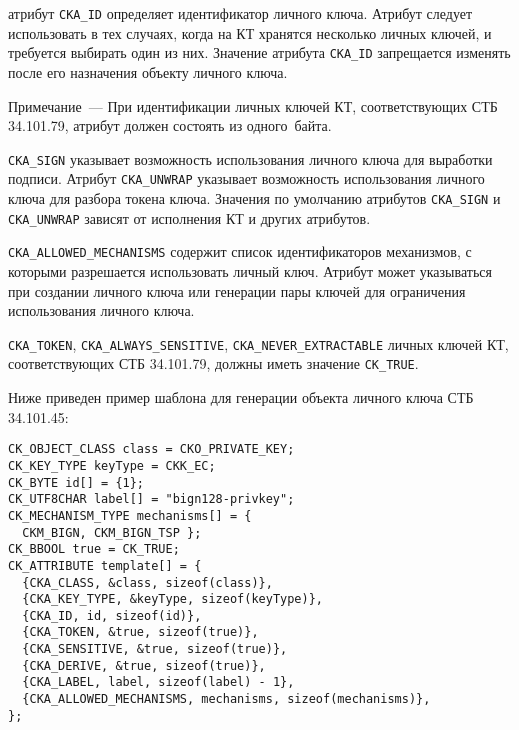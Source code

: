  атрибут \verb|CKA_ID| определяет идентификатор
личного ключа. Атрибут следует использовать в тех случаях, когда на КТ 
хранятся несколько личных ключей, и требуется выбирать один из них. 
%
Значение атрибута \verb|CKA_ID| запрещается изменять
после его назначения объекту личного ключа.

\begin{note}
Примечание~---
При идентификации личных ключей КТ, соответствующих СТБ 34.101.79,
атрибут должен состоять из одного~байта.
\end{note}


 \verb|CKA_SIGN| указывает возможность
использования личного ключа для выработки подписи.
Атрибут \verb|CKA_UNWRAP| указывает возможность
использования личного ключа для разбора токена ключа.
Значения по умолчанию атрибутов \verb|CKA_SIGN| и \verb|CKA_UNWRAP|
зависят от исполнения КТ и других атрибутов.

 \verb|CKA_ALLOWED_MECHANISMS| содержит список
идентификаторов механизмов, с которыми разрешается использовать
личный ключ. Атрибут может указываться при создании личного
ключа или генерации пары ключей для ограничения использования
личного ключа.

 \verb|CKA_TOKEN|, \verb|CKA_ALWAYS_SENSITIVE|, 
\verb|CKA_NEVER_EXTRACTABLE| 
личных ключей КТ, соответствующих СТБ 34.101.79,
должны иметь значение \verb|CK_TRUE|.


Ниже приведен пример шаблона для генерации объекта личного ключа СТБ 34.101.45:
\begin{verbatim}
CK_OBJECT_CLASS class = CKO_PRIVATE_KEY;
CK_KEY_TYPE keyType = CKK_EC;
CK_BYTE id[] = {1};
CK_UTF8CHAR label[] = "bign128-privkey";
CK_MECHANISM_TYPE mechanisms[] = {
  CKM_BIGN, CKM_BIGN_TSP };
CK_BBOOL true = CK_TRUE;
CK_ATTRIBUTE template[] = {
  {CKA_CLASS, &class, sizeof(class)},
  {CKA_KEY_TYPE, &keyType, sizeof(keyType)},
  {CKA_ID, id, sizeof(id)},
  {CKA_TOKEN, &true, sizeof(true)},
  {CKA_SENSITIVE, &true, sizeof(true)},
  {CKA_DERIVE, &true, sizeof(true)},
  {CKA_LABEL, label, sizeof(label) - 1},
  {CKA_ALLOWED_MECHANISMS, mechanisms, sizeof(mechanisms)},
};
\end{verbatim}

